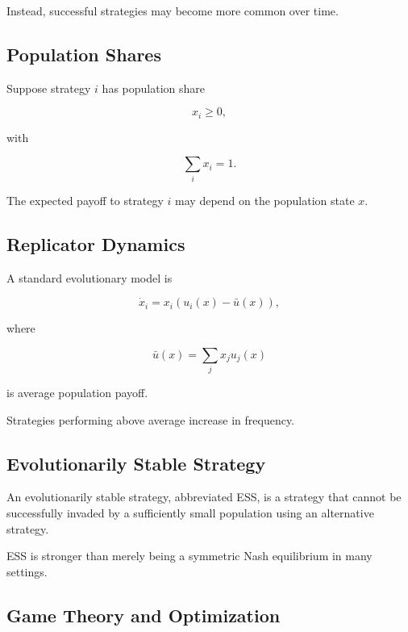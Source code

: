 Instead, successful strategies may become more common over time.

\subsection{Population Shares}
\label{subsec:evolutionary-population-shares}

Suppose strategy \(i\) has population share

\[
\boxed{
x_i\geq0,
}
\]

with

\[
\boxed{
\sum_i
x_i=1.
}
\]

The expected payoff to strategy \(i\) may depend on the population state
\(x\).

\subsection{Replicator Dynamics}
\label{subsec:replicator-dynamics}

A standard evolutionary model is

\[
\boxed{
\dot{x}_i
=
x_i
\left(
u_i(x)
-
\bar u(x)
\right),
}
\]

where

\[
\boxed{
\bar u(x)
=
\sum_j
x_j u_j(x)
}
\]

is average population payoff.

Strategies performing above average increase in frequency.

\subsection{Evolutionarily Stable Strategy}
\label{subsec:evolutionarily-stable-strategy}

An evolutionarily stable strategy, abbreviated ESS, is a strategy that
cannot be successfully invaded by a sufficiently small population using an
alternative strategy.

ESS is stronger than merely being a symmetric Nash equilibrium in many
settings.

\subsection{Game Theory and Optimization}
\label{subsec:game-theory-optimization-connection}

